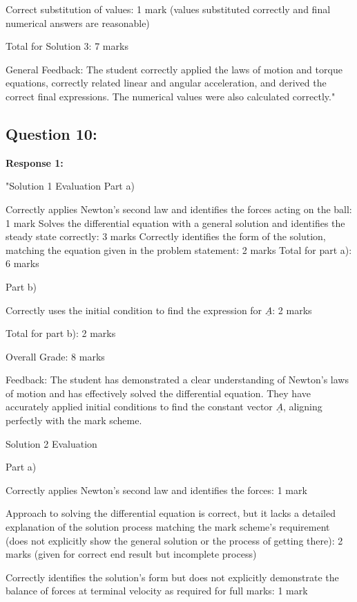 \documentclass[a4paper,11pt]{article}
\begin{document}
Correct substitution of values: 1 mark (values substituted correctly and final numerical answers are reasonable)

Total for Solution 3: 7 marks

General Feedback: The student correctly applied the laws of motion and torque equations, correctly related linear and angular acceleration, and derived the correct final expressions. The numerical values were also calculated correctly."

\subsection*{Question 10:}

\textbf{Response 1:}

"Solution 1 Evaluation
Part a)

Correctly applies Newton's second law and identifies the forces acting on the ball: 1 mark
Solves the differential equation with a general solution and identifies the steady state correctly: 3 marks
Correctly identifies the form of the solution, matching the equation given in the problem statement: 2 marks
Total for part a): 6 marks

Part b)

Correctly uses the initial condition to find the expression for \(\underline{A}\): 2 marks

Total for part b): 2 marks

Overall Grade: 8 marks

Feedback: The student has demonstrated a clear understanding of Newton's laws of motion and has effectively solved the differential equation. They have accurately applied initial conditions to find the constant vector \(\underline{A}\), aligning perfectly with the mark scheme.

Solution 2 Evaluation

Part a)

Correctly applies Newton's second law and identifies the forces: 1 mark

Approach to solving the differential equation is correct, but it lacks a detailed explanation of the solution process matching the mark scheme's requirement (does not explicitly show the general solution or the process of getting there): 2 marks (given for correct end result but incomplete process)

Correctly identifies the solution's form but does not explicitly demonstrate the balance of forces at terminal velocity as required for full marks: 1 mark
\end{document}
